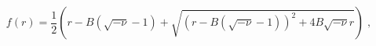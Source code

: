 \begin{equation}
f(r)=\frac{1}{2}\left( r-B(\sqrt{-\nu }-1)+\sqrt{\left( r-B\left( \sqrt{-\nu 
}-1\right) \right) ^{2}+4B\sqrt{-\nu }r}\right) \;,  \label{f}
\end{equation}

